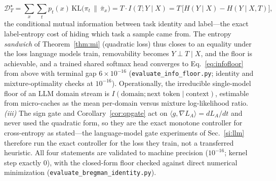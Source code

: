 \documentclass[10pt,a4paper]{article}
\theoremstyle{plain}
\theoremstyle{definition}
\begin{document}
\begin{equation}
\mathcal{D}^\star_T=\sum_x\sum_t p_t(x)\,\mathrm{KL}\!\big(\pi_t\,\|\,\bar\pi_x\big)
=T\cdot I(T;Y\mid X)=T\,\big[H(Y\mid X)-H(Y\mid X,T)\big],
\label{eq:infofloor}
\end{equation}
the conditional mutual information between task identity and label---the exact
label-entropy cost of hiding which task a sample came from. The entropy
\emph{sandwich} of Theorem~\ref{thm:mi} (quadratic loss) thus closes to an equality
under the loss language models train, removability becomes $Y\perp T\mid X$, and the
floor is achievable, and a trained shared softmax head converges to
Eq.~\eqref{eq:infofloor} from above with terminal gap $6\times10^{-16}$
(\texttt{evaluate\_info\_floor.py}; identity and mixture-optimality checks at
$10^{-16}$). Operationally, the irreducible single-model floor of an LLM domain
stream is $I(\text{domain};\text{next token}\mid\text{context})$, estimable from
micro-caches as the mean per-domain versus mixture log-likelihood ratio.
\emph{(iii)} The sign gate and Corollary~\ref{cor:qpgate} act on
$\langle g,\nabla L_A\rangle=dL_A/dt$ and never used the quadratic form, so they are the
exact monotone controller for cross-entropy as stated---the language-model gate
experiments of Sec.~\ref{si:llm} therefore run the exact controller for the loss they
train, not a transferred heuristic. All four statements are validated to machine
precision ($10^{-16}$; kernel step exactly $0$), with the closed-form floor checked
against direct numerical minimization (\texttt{evaluate\_bregman\_identity.py}).
\end{document}

